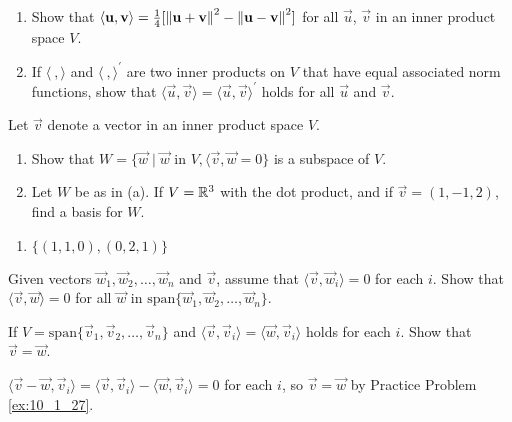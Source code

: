 \documentclass{ximera}
\begin{document}
\begin{problem}\label{prob:inner_prod_25}
\begin{enumerate} 
\item Show that $\langle \mathbf{u}, \mathbf{v} \rangle = \frac{1}{4}[\left\lVert \mathbf{u} + \mathbf{v} \right\rVert ^2 - \left\lVert \mathbf{u} - \mathbf{v} \right\rVert ^2]$ for all $\vec{u}$, $\vec{v}$ in an inner product space $V$.

\item If $\langle\ , \rangle$ and $\langle\ , \rangle^\prime$ are two inner products on $V$ that have equal associated norm functions, show that $\langle\vec{u}, \vec{v}\rangle = \langle\vec{u}, \vec{v}\rangle^\prime$ holds for all $\vec{u}$ and $\vec{v}$.

\end{enumerate}
\end{problem}

\begin{problem}\label{prob:inner_prod_26}
Let $\vec{v}$ denote a vector in an inner product space $V$.

\begin{enumerate} 
\item Show that $W = \{\vec{w} \mid \vec{w} \mbox{ in } V, \langle\vec{v}, \vec{w} = 0\}$ is a subspace of $V$.

\item Let $W$ be as in (a). If $V = \mathbb{R}^3$ with the dot product, and if $\vec{v} = (1, -1, 2)$, find a basis for $W$.

\end{enumerate}
\begin{hint}
\begin{enumerate} 
 
\item  $\{(1, 1, 0), (0, 2, 1)\}$

\end{enumerate}
\end{hint}
\end{problem}

\begin{problem} \label{ex:10_1_27}
Given vectors $\vec{w}_{1}, \vec{w}_{2}, \dots, \vec{w}_{n}$ and $\vec{v}$, assume that $\langle\vec{v}, \vec{w}_{i}\rangle = 0$ for each $i$. Show that $\langle\vec{v}, \vec{w}\rangle = 0$ for all $\vec{w}$ in $\mbox{span}\{\vec{w}_{1}, \vec{w}_{2}, \dots, \vec{w}_{n}\}$.
\end{problem}

\begin{problem}\label{prob:inner_prod_28}
If $V = \mbox{span}\{\vec{v}_{1}, \vec{v}_{2}, \dots, \vec{v}_{n}\}$ and $\langle\vec{v}, \vec{v}_{i}\rangle = \langle\vec{w}, \vec{v}_i\rangle$ holds for each $i$. Show that $\vec{v} = \vec{w}$.

\begin{hint}
$\langle \vec{v} - \vec{w}, \vec{v}_{i} \rangle = \langle \vec{v}, \vec{v}_{i} \rangle - \langle \vec{w}, \vec{v}_{i} \rangle = 0$ for each $i$, so $\vec{v} = \vec{w}$ by Practice Problem \ref{ex:10_1_27}.
\end{hint}
\end{problem}
\end{document}
